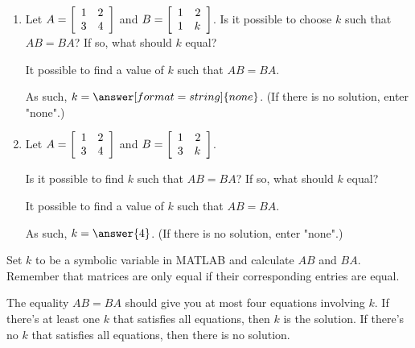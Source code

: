 \documentclass{ximera}
\author{Zack Reed}
\begin{document}
\begin{problem}

\begin{enumerate}

    \item Let $A=\startmat{rr}
  1 & 2 \\
  3 & 4
\stopmat$ and $B=\startmat{rr}
  1 & 2 \\
  1 & k
\stopmat$. Is it possible to choose $k$ such that $AB=BA$? If so, what
should $k$ equal?

It  possible to find a value of $k$ such that $AB=BA$.

As such, $k=\answer[format=string]{none}$. (If there is no solution, enter "none".)

\item Let $A=\startmat{rr}
    1 & 2 \\
    3 & 4
  \stopmat$ and $B=\startmat{rr}
    1 & 2 \\
    3 & k
  \stopmat$. 
  
  Is it possible to find $k$ such that $AB=BA$? If
  so, what should $k$ equal?
  

It  possible to find a value of $k$ such that $AB=BA$.

    As such, $k=\answer{4}$. (If there is no solution, enter "none".)

\end{enumerate}

\begin{hint}
  

    Set $k$ to be a symbolic variable in MATLAB and calculate $AB$ and $BA$. Remember that matrices are only equal if their corresponding entries are equal.

    The equality $AB=BA$ should give you at most four equations involving $k$. If there's at least one $k$ that satisfies all equations, then $k$ is the solution. If there's no $k$ that satisfies all equations, then there is no solution.
  
    \end{hint}

\end{problem}
\end{document}
